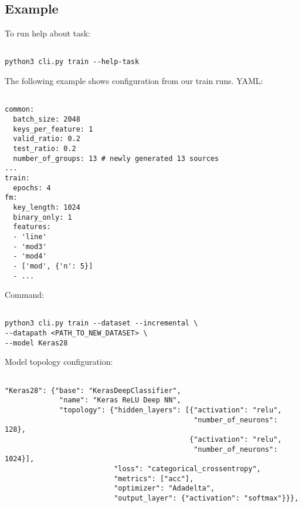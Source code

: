 \subsection*{Example}

To run help about task:

\begin{verbatim}

python3 cli.py train --help-task

\end{verbatim}

\noindent
The following example shows configuration from our train runs. YAML:

\begin{verbatim}

common:
  batch_size: 2048
  keys_per_feature: 1
  valid_ratio: 0.2
  test_ratio: 0.2
  number_of_groups: 13 # newly generated 13 sources
...  
train:
  epochs: 4
fm:
  key_length: 1024
  binary_only: 1
  features:
  - 'line'
  - 'mod3'
  - 'mod4'
  - ['mod', {'n': 5}]
  - ...
\end{verbatim}

\noindent
Command:

\begin{verbatim}

python3 cli.py train --dataset --incremental \
--datapath <PATH_TO_NEW_DATASET> \
--model Keras28

\end{verbatim}

\noindent
Model topology configuration:

\begin{verbatim}

"Keras28": {"base": "KerasDeepClassifier",
             "name": "Keras ReLU Deep NN",
             "topology": {"hidden_layers": [{"activation": "relu",
                                             "number_of_neurons": 128},
                                            {"activation": "relu",
                                             "number_of_neurons": 1024}],
                          "loss": "categorical_crossentropy",
                          "metrics": ["acc"],
                          "optimizer": "Adadelta",
                          "output_layer": {"activation": "softmax"}}},

\end{verbatim}

